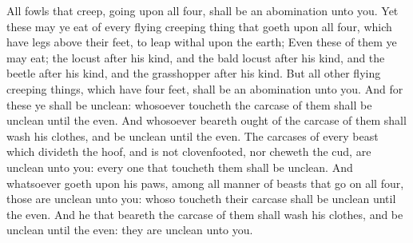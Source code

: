  All fowls that creep, going upon all four, shall be an
abomination unto you.  Yet these may ye eat of every flying
creeping thing that goeth upon all four, which have legs above their
feet, to leap withal upon the earth;  Even these of them ye
may eat; the locust after his kind, and the bald locust after his kind,
and the beetle after his kind, and the grasshopper after his kind.
 But all other flying creeping things, which have four
feet, shall be an abomination unto you.  And for these ye
shall be unclean: whosoever toucheth the carcase of them shall be
unclean until the even.  And whosoever beareth ought of the
carcase of them shall wash his clothes, and be unclean until the even.
 The carcases of every beast which divideth the hoof, and
is not clovenfooted, nor cheweth the cud, are unclean unto you: every
one that toucheth them shall be unclean.  And whatsoever
goeth upon his paws, among all manner of beasts that go on all four,
those are unclean unto you: whoso toucheth their carcase shall be
unclean until the even.  And he that beareth the carcase of
them shall wash his clothes, and be unclean until the even: they are
unclean unto you.

